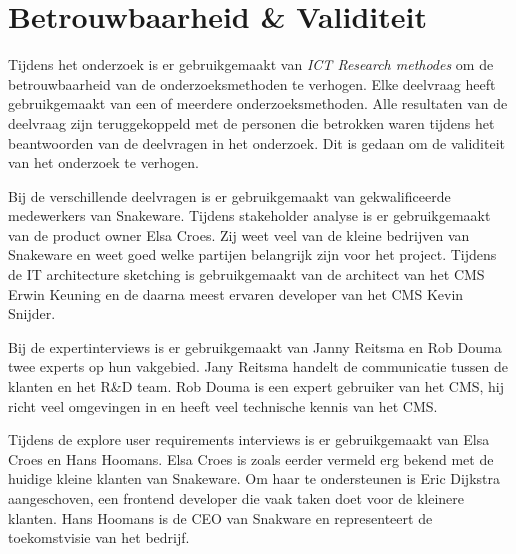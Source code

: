 \section{Betrouwbaarheid \& Validiteit}
Tijdens het onderzoek is er gebruikgemaakt van \textit{ICT Research methodes} om de betrouwbaarheid van de onderzoeksmethoden te verhogen.
Elke deelvraag heeft gebruikgemaakt van een of meerdere onderzoeksmethoden.
Alle resultaten van de deelvraag zijn teruggekoppeld met de personen die betrokken waren tijdens het beantwoorden van de deelvragen in het onderzoek.
Dit is gedaan om de validiteit van het onderzoek te verhogen.

\whitespace
Bij de verschillende deelvragen is er gebruikgemaakt van gekwalificeerde medewerkers van Snakeware.
Tijdens stakeholder analyse is er gebruikgemaakt van de product owner Elsa Croes.
Zij weet veel van de kleine bedrijven van Snakeware en weet goed welke partijen belangrijk zijn voor het  project.
Tijdens de IT architecture sketching is gebruikgemaakt van de architect van het CMS Erwin Keuning en de daarna meest ervaren developer van het CMS Kevin Snijder.

Bij de expertinterviews is er gebruikgemaakt van Janny Reitsma en Rob Douma twee experts op hun vakgebied.
Jany Reitsma handelt de communicatie tussen de klanten en het R\&D team.
Rob Douma is een expert gebruiker van het CMS, hij richt veel omgevingen in en heeft veel technische kennis van het CMS.

Tijdens de explore user requirements interviews is er gebruikgemaakt van Elsa Croes en Hans Hoomans.
Elsa Croes is zoals eerder vermeld erg bekend met de huidige kleine klanten van Snakeware.
Om haar te ondersteunen is Eric Dijkstra aangeschoven, een frontend developer die vaak taken doet voor de kleinere klanten.
Hans Hoomans is de CEO van Snakware en representeert de toekomstvisie van het bedrijf.
%
